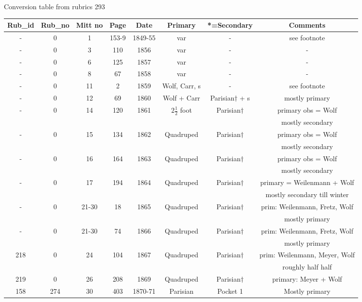 \documentclass[12pt]{article}
\begin{document}
{\centering
    \caption{Conversion table from rubrics 293}
    \begin{tabular}{c|c|c|c|c|c|c|c}
        Rub_{id} & Rub_{no} & Mitt no & Page & Date & Primary & *=Secondary& Comments \\
        \hline
        - & 0 & 1 & 153-9 & 1849-55 & var & - & see footnote \footnotemark[7] \\ 
        - & 0 & 3 & 110 & 1856 & var & - & - \\ 
        - & 0 & 6 & 125 & 1857 & var & - & - \\
        - & 0 & 8 & 67 & 1858 & var & - & - \\
        - & 0 & 11 & 2 & 1859 & Wolf, Carr, s & - & see footnote \footnotemark[6] \\
        - & 0 & 12 & 69 & 1860 & Wolf + Carr & Parisian$\dagger$ + s & mostly primary \footnotemark[5]  \\ 
        - & 0 & 14 & 120 & 1861 & $2\frac{1}{2}$ foot & Parisian$\dagger$ & primary obs = Wolf\\
        &&&&&&& mostly secondary\\
        - & 0 & 15 & 134 & 1862 & Quadruped & Parisian$\dagger$ & primary obs = Wolf\\
        &&&&&&& mostly secondary\\
        - & 0 & 16 & 164 & 1863 & Quadruped & Parisian$\dagger$ & primary obs = Wolf\\
        &&&&&&& mostly secondary\\
        - & 0 & 17 & 194 & 1864 & Quadruped & Parisian$\dagger$ & primary = Weilenmann + Wolf \\
        &&&&&&& mostly secondary till winter\\
        - & 0 & 21-30 & 18 & 1865 & Quadruped & Parisian$\dagger$ & prim: Weilenmann, Fretz, Wolf \\
        &&&&&&& mostly primary\\
        - & 0 & 21-30 & 74 & 1866 & Quadruped & Parisian$\dagger$ & prim: Weilenmann, Fretz, Wolf \\
        &&&&&&& mostly primary\\
        218 & 0 & 24 & 104 & 1867 & Quadruped & Parisian$\dagger$ & prim: Weilenmann, Meyer, Wolf \\
        &&&&&&& roughly half half\\
        219 & 0 & 26 & 208 & 1869 & Quadruped & Parisian$\dagger$ & primary: Meyer + Wolf\\
        158 & 274 & 30 & 403 & 1870-71 & Parisian & Pocket 1 & Mostly primary \\

\end{tabular}}
\end{document}
